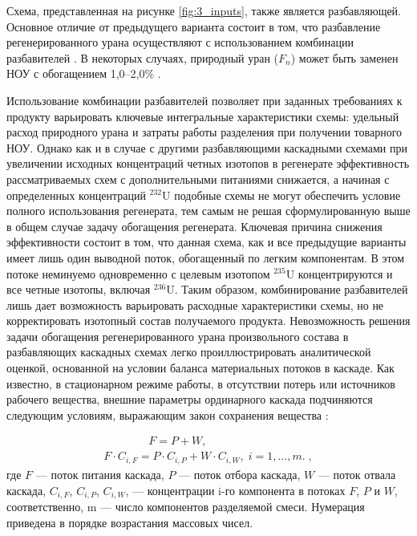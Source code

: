 Схема, представленная на рисунке \ref{fig:3_inputs}, также является разбавляющей. Основное отличие от предыдущего варианта состоит в том, что разбавление регенерированного урана осуществляют с использованием комбинации разбавителей \cite{smirnovObogashchenieRegenerirovannogoUrana2014}. В некоторых случаях, природный уран ($F_n$) может быть заменен НОУ с обогащением 1,0--2,0\% \cite{2024smirnovObogashchenieRegenerirovannogoUrana2017}.

Использование комбинации разбавителей позволяет при заданных требованиях к продукту варьировать ключевые интегральные характеристики схемы: удельный расход природного урана и затраты работы разделения при получении товарного НОУ. Однако как и в случае с другими разбавляющими каскадными схемами при увеличении исходных концентраций четных изотопов в регенерате эффективность рассматриваемых схем с дополнительными питаниями снижается, а начиная с определенных концентраций $^{232}$U подобные схемы не могут обеспечить условие полного использования регенерата, тем самым не решая сформулированную выше в общем случае задачу обогащения регенерата. Ключевая причина снижения эффективности состоит в том, что данная схема, как и все предыдущие варианты имеет лишь один выводной поток, обогащенный по легким компонентам. В этом потоке неминуемо одновременно с целевым изотопом $^{235}$U концентрируются и все четные изотопы, включая $^{236}$U. Таким образом, комбинирование разбавителей лишь дает возможность варьировать расходные характеристики схемы, но не корректировать изотопный состав получаемого продукта.
Невозможность решения задачи обогащения регенерированного урана произвольного состава в разбавляющих каскадных схемах легко проиллюстрировать аналитической оценкой, основанной на условии баланса материальных потоков в каскаде. 
Как известно, в стационарном режиме работы, в отсутствии потерь или источников рабочего вещества, внешние параметры ординарного каскада подчиняются следующим условиям, выражающим закон сохранения вещества \cite{sulaberidzeTeoriyaKaskadovDlya2011}:
				  
\begin{equation} \label{EQ__1} 
  \begin{array}{l} {\quad \quad \quad \quad F=P+W,} \\ {F \cdot C_{i,F} =P \cdot C_{i,P} +W \cdot C_{i,W} ,\; i=1,...,m. \; ,} \end{array}
\end{equation} 
где $F$ --- поток питания каскада, $P$ --- поток отбора каскада, $W$ --- поток отвала каскада, $C_{i,F}$, $C_{i,P}$, $C_{i,W}$, --- концентрации i-го компонента в потоках $F$, $P$ и $W$, соответственно, m --- число компонентов разделяемой смеси. Нумерация приведена в порядке возрастания массовых чисел.


